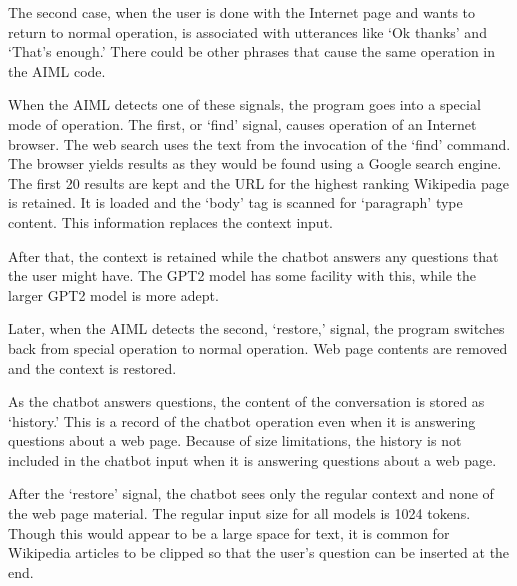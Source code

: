 The second case, when the user is done with the Internet page and wants to return to normal operation, is associated with utterances like `Ok thanks' and `That's enough.' 
There could be other phrases that cause the same operation in the AIML code.

When the AIML detects one of these signals, the program goes into a special mode of operation. The first, or `find' signal, causes operation of an Internet browser. The web search uses the text from the invocation of the `find' command. The browser yields results as they would be found using a Google search engine. The first 20 results are kept and the URL for the highest ranking Wikipedia page is retained. It is loaded and the `body' tag is scanned for `paragraph' type content. This information replaces the context input. 

After that, the context is retained while the chatbot answers any questions that the user might have. The GPT2 model has some facility with this, while the larger GPT2 model is more adept.

Later, when the AIML detects the second, `restore,' signal, the program switches back from special operation to normal operation. Web page contents are removed and the context is restored. %

As the chatbot answers questions, the content of the conversation is stored as `history.' %
This is a record of the chatbot operation even when it is answering questions about a web page. %
Because of size limitations, the history is not included in the chatbot input when it is answering questions about a web page. %


After the `restore' signal, the chatbot sees only the regular context and none of the web page material. The regular input size for all models is 1024 tokens. %
Though this would appear to be a large space for text, it is common for Wikipedia articles to be clipped so that the user's question can be inserted at the end.

